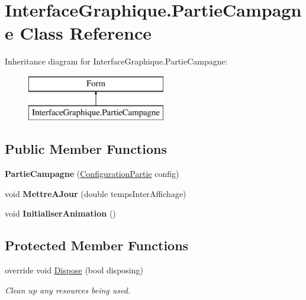 \hypertarget{class_interface_graphique_1_1_partie_campagne}{\section{Interface\-Graphique.\-Partie\-Campagne Class Reference}
\label{class_interface_graphique_1_1_partie_campagne}
}
Inheritance diagram for Interface\-Graphique.\-Partie\-Campagne\-:\begin{figure}[H]
\begin{center}
\leavevmode
\includegraphics[height=2.000000cm]{class_interface_graphique_1_1_partie_campagne}
\end{center}
\end{figure}
\subsection*{Public Member Functions}
\begin{DoxyCompactItemize}
\item 
\hypertarget{class_interface_graphique_1_1_partie_campagne_a09c97c7d20e5f81ae694c7d5a8902cfc}{{\bfseries Partie\-Campagne} (\hyperlink{class_interface_graphique_1_1_configuration_partie}{Configuration\-Partie} config)}\label{class_interface_graphique_1_1_partie_campagne_a09c97c7d20e5f81ae694c7d5a8902cfc}

\item 
\hypertarget{class_interface_graphique_1_1_partie_campagne_abd2bb254a6fc89e1fcf4866f26a33b5e}{void {\bfseries Mettre\-A\-Jour} (double temps\-Inter\-Affichage)}\label{class_interface_graphique_1_1_partie_campagne_abd2bb254a6fc89e1fcf4866f26a33b5e}

\item 
\hypertarget{class_interface_graphique_1_1_partie_campagne_a195a2c4b17dc6ebc55240ff5f9e822b4}{void {\bfseries Initialiser\-Animation} ()}\label{class_interface_graphique_1_1_partie_campagne_a195a2c4b17dc6ebc55240ff5f9e822b4}

\end{DoxyCompactItemize}
\subsection*{Protected Member Functions}
\begin{DoxyCompactItemize}
\item 
override void \hyperlink{class_interface_graphique_1_1_partie_campagne_a7722af971723630e8fee2f3ac1bfa07e}{Dispose} (bool disposing)
\begin{DoxyCompactList}\small\item\em Clean up any resources being used. \end{DoxyCompactList}\end{DoxyCompactItemize}



